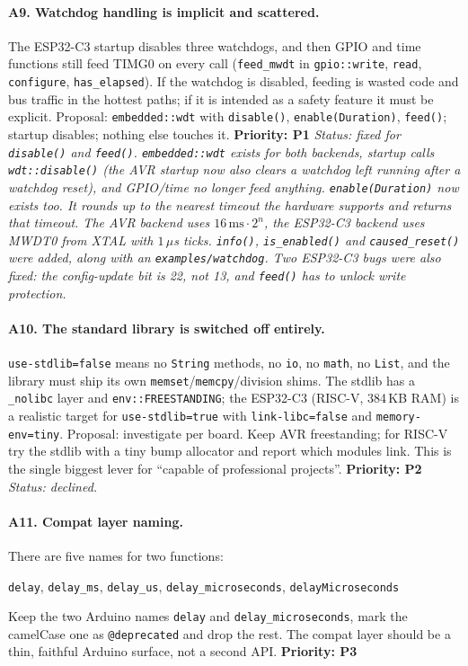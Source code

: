 \documentclass[11pt,a4paper]{article}
\newcommand{\pkg}[1]{\texttt{#1}}
\newcommand{\prio}[1]{\textbf{Priority: #1}}
\begin{document}
\paragraph{A9. Watchdog handling is implicit and scattered.}
The ESP32-C3 startup disables three watchdogs, and then GPIO and time functions still feed
TIMG0 on every call (\pkg{feed\_mwdt} in \pkg{gpio::write}, \pkg{read}, \pkg{configure}, \pkg{has\_elapsed}).
If the watchdog is disabled, feeding is wasted code and bus traffic in the hottest paths; if it is
intended as a safety feature it must be explicit. Proposal: \pkg{embedded::wdt} with
\pkg{disable()}, \pkg{enable(Duration)}, \pkg{feed()}; startup disables; nothing else touches it.
\prio{P1}
\textit{Status: fixed for \pkg{disable()} and \pkg{feed()}. \pkg{embedded::wdt} exists for both
backends, startup calls \pkg{wdt::disable()} (the AVR startup now also clears a watchdog left running
after a watchdog reset), and GPIO/time no longer feed anything. \pkg{enable(Duration)} now exists too.
It rounds up to the nearest timeout the hardware supports and returns that timeout. The AVR backend
uses $16\,\text{ms}\cdot 2^n$, the ESP32-C3 backend uses MWDT0 from XTAL with $1\,\mu$s ticks.
\pkg{info()}, \pkg{is\_enabled()} and \pkg{caused\_reset()} were added, along with an \pkg{examples/watchdog}.
Two ESP32-C3 bugs were also fixed: the config-update bit is 22, not 13, and \pkg{feed()} has to unlock write protection.}

\paragraph{A10. The standard library is switched off entirely.}
\pkg{use-stdlib=false} means no \pkg{String} methods, no \pkg{io}, no \pkg{math}, no
\pkg{List}, and the library must ship its own \pkg{memset}/\pkg{memcpy}/division shims. The
stdlib has a \pkg{\_nolibc} layer and \pkg{env::FREESTANDING}; the ESP32-C3 (RISC-V, 384\,KB RAM) is a
realistic target for \pkg{use-stdlib=true} with \pkg{link-libc=false} and \pkg{memory-env=tiny}.
Proposal: investigate per board. Keep AVR freestanding; for RISC-V try the stdlib with a tiny
bump allocator and report which modules link. This is the single biggest lever for
``capable of professional projects''. \prio{P2}
\textit{Status: declined.}

\paragraph{A11. Compat layer naming.}
There are five names for two functions:
\begin{center}\pkg{delay}, \pkg{delay\_ms}, \pkg{delay\_us}, \pkg{delay\_microseconds}, \pkg{delayMicroseconds}\end{center}
Keep the two Arduino names \pkg{delay} and \pkg{delay\_microseconds}, mark the camelCase one as
\pkg{@deprecated} and drop the rest. The compat layer should be a thin, faithful Arduino surface, not a second API. \prio{P3}
\end{document}
